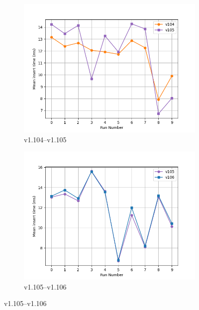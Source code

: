 \begin{figure}[ht]
    \captionsetup[subfigure]{list=true}
    \centering
    \begin{subfigure}[b]{0.48\textwidth}
        \centering
        \includegraphics[width=\textwidth]{figures/mean_inserts_time_all_runs-v104-v105.png}
        \caption{v1.104--v1.105}
        \label{fig:mean_inserts_time_all_runs-v104-v105}
    \end{subfigure}
    \hfill
    \begin{subfigure}[b]{0.48\textwidth}
        \centering
        \includegraphics[width=\textwidth]{figures/mean_inserts_time_all_runs-v105-v106.png}
        \caption{v1.105--v1.106}
        \label{fig:mean_inserts_time_all_runs-v105-v106}
    \end{subfigure}


\end{figure}
